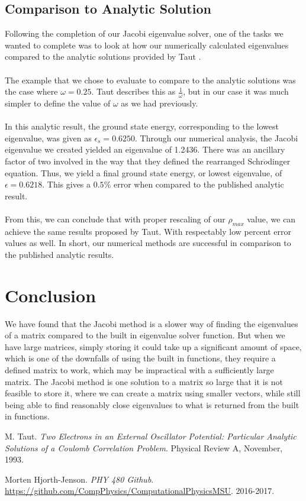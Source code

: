 \documentclass{article}
\begin{document}
\subsection{Comparison to Analytic Solution}
Following the completion of our Jacobi eigenvalue solver, one of the tasks we wanted to complete was to look at how our numerically calculated eigenvalues compared to the analytic solutions provided by Taut \cite{journal}. \\
\\
The example that we chose to evaluate to compare to the analytic solutions was the case where $\omega=0.25$. Taut describes this as $\frac{1}{\omega}$, but in our case it was much simpler to define the value of $\omega$ as we had previously. \\
\\
In this analytic result, the ground state energy, corresponding to the lowest eigenvalue, was given as $\epsilon_{s}=0.6250$. Through our numerical analysis, the Jacobi eigenvalue we created yielded an eigenvalue of 1.2436. There was an ancillary factor of two involved in the way that they defined the rearranged Schr$\ddot{o}$dinger equation. Thus, we yield a final ground state energy, or lowest eigenvalue, of $\epsilon=0.6218$. This gives a $0.5\%$ error when compared to the published analytic result. \\
\\
From this, we can conclude that with proper rescaling of our $\rho_{max}$ value, we can achieve the same results proposed by Taut. With respectably low percent error values as well. In short, our numerical methods are successful in comparison to the published analytic results.

\section{Conclusion}
We have found that the Jacobi method is a slower way of finding the eigenvalues of a matrix compared to the built in eigenvalue solver function. But when we have large matrices, simply storing it could take up a significant amount of space, which is one of the downfalls of using the built in functions, they require a defined matrix to work, which may be impractical with a sufficiently large matrix. The Jacobi method is one solution to a matrix so large that it is not feasible to store it, where we can create a matrix using smaller vectors, while still being able to find reasonably close eigenvalues to what is returned from the built in functions.

\begin{thebibliography}{2}
 M. Taut. \textit{Two Electrons in an External Oscillator Potential: Particular Analytic Solutions of a Coulomb Correlation Problem}. Physical Review A, November, 1993.  

 Morten Hjorth-Jenson. \textit{PHY 480 Github}.\\ \url{https://github.com/CompPhysics/ComputationalPhysicsMSU}. 2016-2017.


\end{thebibliography}



\end{document}
